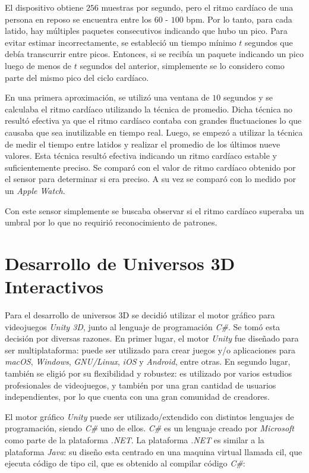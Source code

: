 El dispositivo obtiene $256$ muestras por segundo, pero el ritmo cardíaco de una persona en reposo se encuentra entre los $60$ - $100$ \acrshort{bpm}. Por lo tanto, para cada latido, hay múltiples paquetes consecutivos indicando que hubo un pico. Para evitar estimar incorrectamente, se estableció un tiempo mínimo $t$ segundos que debía transcurrir entre picos. Entonces, si se recibía un paquete indicando un pico luego de menos de $t$ segundos del anterior, simplemente se lo considero como parte del mismo pico del ciclo cardíaco.

En una primera aproximación, se utilizó una ventana de $10$ segundos y se calculaba el ritmo cardíaco utilizando la técnica de promedio. Dicha técnica no resultó efectiva ya que el ritmo cardíaco contaba con grandes fluctuaciones lo que causaba que sea inutilizable en tiempo real. Luego, se empezó a utilizar la técnica de medir el tiempo entre latidos y realizar el promedio de los últimos nueve valores. Esta técnica resultó efectiva indicando un ritmo cardíaco estable y suficientemente preciso. Se comparó con el valor de ritmo cardíaco obtenido por el sensor para determinar si era preciso. A su vez se comparó con lo medido por un \emph{Apple Watch}.

Con este sensor simplemente se buscaba observar si el ritmo cardíaco superaba un umbral por lo que no requirió reconocimiento de patrones.

\section{Desarrollo de Universos 3D Interactivos} \label{sec:unity-net}

Para el desarrollo de universos 3D se decidió utilizar el motor gráfico para videojuegos \emph{Unity 3D}, junto al lenguaje de programación \emph{C\#}. Se tomó esta decisión por diversas razones. En primer lugar, el motor \emph{Unity} fue diseñado para ser multiplataforma: puede ser utilizado para crear juegos y/o aplicaciones para \emph{macOS}, \emph{Windows}, \emph{GNU/Linux}, \emph{iOS} y \emph{Android}, entre otras. En segundo lugar, también se eligió por su flexibilidad y robustez: es utilizado por varios estudios profesionales de videojuegos, y también por una gran cantidad de usuarios independientes, por lo que cuenta con una gran comunidad de creadores.

El motor gráfico \emph{Unity} puede ser utilizado/extendido con distintos lenguajes de programación, siendo \emph{C\#} uno de ellos. \emph{C\#} es un lenguaje creado por \emph{Microsoft} como parte de la plataforma \emph{.NET}.  La plataforma \emph{.NET} es similar a la plataforma \emph{Java}: su diseño esta centrado en una maquina virtual llamada \gls{cil}, que ejecuta código de tipo \acrshort{cil}, que es obtenido al compilar código \emph{C\#}:

